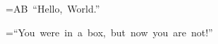 =\hbox{\selffamily AB ``Hello, World.''}
\par
{}=\hbox{``You were in a box, but now you are not!''}
\bye
